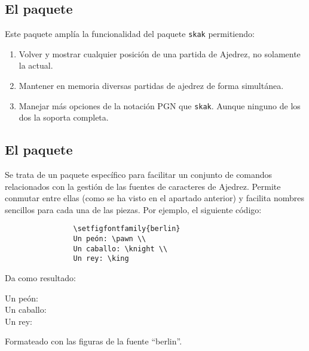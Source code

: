 \documentclass[a4paper,10pt, twocolumn]{article}
\newenvironment{marcod}{\begin{adjustwidth}{0.5cm}{}}{\end{adjustwidth}}
\begin{document}
    	\subsection{El paquete }
        
        Este paquete amplía la funcionalidad del paquete \texttt{skak} permitiendo:
        
        \begin{enumerate}
            \item Volver y mostrar cualquier posición de una partida de Ajedrez, no solamente la actual.
            \item Mantener en memoria diversas partidas de ajedrez de forma simultánea.
            \item Manejar más opciones de la notación PGN que \texttt{skak}. Aunque ninguno de los dos la soporta completa.
        \end{enumerate}    

        \subsection{El paquete }
        
        Se trata de un paquete específico para facilitar un conjunto de comandos relacionados con la gestión de las fuentes de caracteres de Ajedrez. Permite conmutar entre ellas (como se ha visto en el apartado anterior) y facilita nombres sencillos para cada una de las piezas. Por ejemplo, el siguiente código:
        
        \begin{marcod}
            \begin{verbatim}
                \setfigfontfamily{berlin}
                Un peón: \pawn \\
                Un caballo: \knight \\
                Un rey: \king
            \end{verbatim}
        \end{marcod}
        
        Da como resultado:
        
        Un peón: \pawn \\
        \indent Un caballo: \knight \\
        \indent Un rey: \king
        
        Formateado con las figuras de la fuente “berlin”.
        
\end{document}
